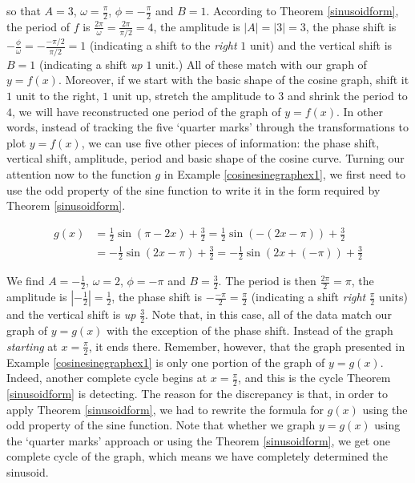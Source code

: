 so that $A = 3$, $\omega = \frac{\pi}{2}$, $\phi = -\frac{\pi}{2}$ and $B = 1$.  According to Theorem \ref{sinusoidform}, the period of $f$ is $\frac{2\pi}{\omega} = \frac{2\pi}{\pi/2} = 4$, the amplitude is $|A| = |3| = 3$, the phase shift is $-\frac{\phi}{\omega} = -\frac{-\pi/2}{\pi/2} = 1$ (indicating a shift to the \textit{right} $1$ unit) and the vertical shift is $B = 1$ (indicating a shift \textit{up} $1$ unit.) All of these match with our graph of $y=f(x)$.  Moreover, if we start with the basic shape of the cosine graph, shift it $1$ unit to the right, $1$ unit up, stretch the amplitude to $3$ and shrink the period to $4$, we will have reconstructed one period of the graph of $y=f(x)$.  In other words, instead of tracking the five `quarter marks' through the transformations to plot $y=f(x)$, we can use five other pieces of information:  the phase shift, vertical shift, amplitude, period and basic shape of the cosine curve.   Turning our attention now to the function $g$ in Example \ref{cosinesinegraphex1}, we first need to use the odd property of the sine function to write it in the form required by Theorem \ref{sinusoidform}.

\begin{align*}
g(x) &= \frac{1}{2} \sin(\pi - 2x) + \frac{3}{2} = \frac{1}{2} \sin(-(2x - \pi)) + \frac{3}{2}\\
& = -\frac{1}{2} \sin(2x - \pi) + \frac{3}{2}= -\frac{1}{2} \sin(2x + (-\pi)) + \frac{3}{2}
\end{align*}

\smallskip

We find $A = -\frac{1}{2}$, $\omega = 2$, $\phi = -\pi$ and $B = \frac{3}{2}$.  The period is then $\frac{2\pi}{2} = \pi$, the amplitude is $\left| - \frac{1}{2} \right| = \frac{1}{2}$, the phase shift is $-\frac{-\pi}{2} = \frac{\pi}{2}$ (indicating a shift \textit{right} $\frac{\pi}{2}$ units) and the vertical shift is \textit{up} $\frac{3}{2}$.  Note that, in this case, all of the data match our graph of $y=g(x)$ with the exception of the phase shift.  \label{phaseshiftissue} Instead of the graph \textit{starting} at $x = \frac{\pi}{2}$, it ends there.  Remember, however, that the graph presented in Example \ref{cosinesinegraphex1} is only one portion of the graph of $y=g(x)$.  Indeed, another complete cycle begins at $x = \frac{\pi}{2}$, and this is the cycle Theorem \ref{sinusoidform} is detecting.  The reason for the discrepancy is that, in order to apply  Theorem \ref{sinusoidform}, we had to rewrite the formula for $g(x)$ using the odd property of the sine function.  Note that whether we graph $y=g(x)$ using the `quarter marks' approach or using the Theorem \ref{sinusoidform}, we get one complete cycle of the graph, which means we have completely determined the sinusoid.

